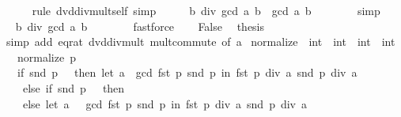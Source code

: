\begin{isabellebody}
\ \ \ \ \isamarkupfalse%
\ {\isacharparenleft}{\kern0pt}rule\ dvd{\isacharunderscore}{\kern0pt}div{\isacharunderscore}{\kern0pt}mult{\isacharunderscore}{\kern0pt}self{\isacharparenright}{\kern0pt}\ simp\isanewline
\ \ \isamarkupfalse%
\ \isamarkupfalse%
\ {\isachardoublequoteopen}b\ div\ gcd\ a\ b\ {\isacharasterisk}{\kern0pt}\ gcd\ a\ b\ {\isasymnoteq}\ {}{\isachardoublequoteclose}\isanewline
\ \ \ \ \isamarkupfalse%
\ simp\isanewline
\ \ \isamarkupfalse%
\ \isamarkupfalse%
\ {\isachardoublequoteopen}b\ div\ gcd\ a\ b\ {\isasymnoteq}\ {}{\isachardoublequoteclose}\isanewline
\ \ \ \ \isamarkupfalse%
\ fastforce\isanewline
\ \ \isamarkupfalse%
\ False\ \isamarkupfalse%
\ {\isacharquery}{\kern0pt}thesis\isanewline
\ \ \ \ \isamarkupfalse%
\ {\isacharparenleft}{\kern0pt}simp\ add{\isacharcolon}{\kern0pt}\ eq{\isacharunderscore}{\kern0pt}rat\ dvd{\isacharunderscore}{\kern0pt}div{\isacharunderscore}{\kern0pt}mult\ mult{\isachardot}{\kern0pt}commute\ {\isacharbrackleft}{\kern0pt}of\ a{\isacharbrackright}{\kern0pt}{\isacharparenright}{\kern0pt}\isanewline
{}\isamarkupfalse%
%
\endisatagproof
{\isafoldproof}%
%
\isadelimproof
\isanewline
%
\endisadelimproof
\isanewline
{}\isamarkupfalse%
\ normalize\ {\isacharcolon}{\kern0pt}{\isacharcolon}{\kern0pt}\ {\isachardoublequoteopen}int\ {\isasymtimes}\ int\ {\isasymRightarrow}\ int\ {\isasymtimes}\ int{\isachardoublequoteclose}\isanewline
\ \ \ {\isachardoublequoteopen}normalize\ p\ {\isacharequal}{\kern0pt}\isanewline
\ \ \ {\isacharparenleft}{\kern0pt}if\ snd\ p\ {\isachargreater}{\kern0pt}\ {}\ then\ {\isacharparenleft}{\kern0pt}let\ a\ {\isacharequal}{\kern0pt}\ gcd\ {\isacharparenleft}{\kern0pt}fst\ p{\isacharparenright}{\kern0pt}\ {\isacharparenleft}{\kern0pt}snd\ p{\isacharparenright}{\kern0pt}\ in\ {\isacharparenleft}{\kern0pt}fst\ p\ div\ a{\isacharcomma}{\kern0pt}\ snd\ p\ div\ a{\isacharparenright}{\kern0pt}{\isacharparenright}{\kern0pt}\isanewline
\ \ \ \ else\ if\ snd\ p\ {\isacharequal}{\kern0pt}\ {}\ then\ {\isacharparenleft}{\kern0pt}{}{\isacharcomma}{\kern0pt}\ {}{\isacharparenright}{\kern0pt}\isanewline
\ \ \ \ else\ {\isacharparenleft}{\kern0pt}let\ a\ {\isacharequal}{\kern0pt}\ {\isacharminus}{\kern0pt}\ gcd\ {\isacharparenleft}{\kern0pt}fst\ p{\isacharparenright}{\kern0pt}\ {\isacharparenleft}{\kern0pt}snd\ p{\isacharparenright}{\kern0pt}\ in\ {\isacharparenleft}{\kern0pt}fst\ p\ div\ a{\isacharcomma}{\kern0pt}\ snd\ p\ div\ a{\isacharparenright}{\kern0pt}{\isacharparenright}{\kern0pt}{\isacharparenright}{\kern0pt}{\isachardoublequoteclose}\isanewline

\end{isabellebody}
